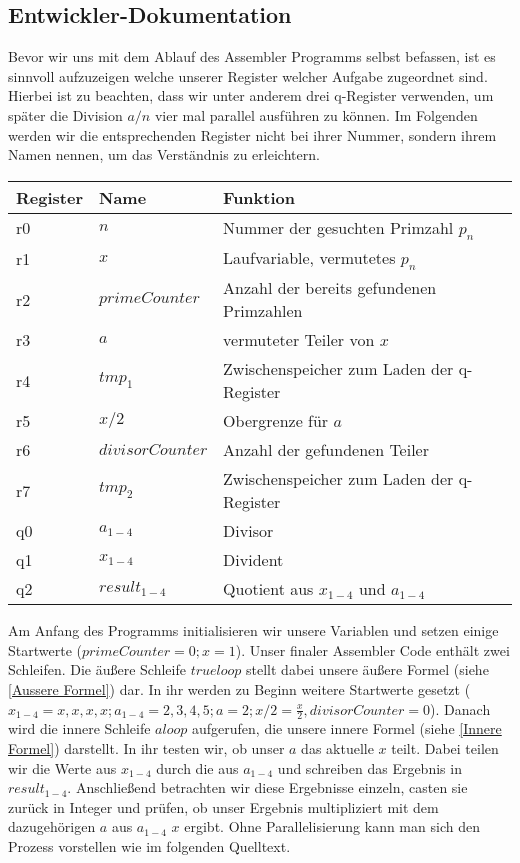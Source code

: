\documentclass[11pt]{scrartcl}
\begin{document}
\subsection{Entwickler-Dokumentation}
Bevor wir uns mit dem Ablauf des Assembler Programms selbst befassen, ist es sinnvoll aufzuzeigen welche unserer Register welcher Aufgabe zugeordnet sind. Hierbei ist zu beachten, dass wir unter anderem drei q-Register verwenden, um später die Division $a/n$ vier mal parallel ausführen zu können. Im Folgenden werden wir die entsprechenden Register nicht bei ihrer Nummer, sondern ihrem Namen nennen, um das Verständnis zu erleichtern. 
\begin{center}
    \begin{tabular}{ | l | l | l | p{15cm} |}
    \hline
    Register &  Name & Funktion \\ \hline
    r0 & $n$ & Nummer der gesuchten Primzahl $p_n$\\ 
    r1 & $x$ & Laufvariable, vermutetes $p_n$\\
    r2 & $primeCounter$ & Anzahl der bereits gefundenen Primzahlen\\
    r3 & $a$ & vermuteter Teiler von $x$\\
    r4 & $tmp_1$ & Zwischenspeicher zum Laden der q-Register\\
    r5 & $x/2$ & Obergrenze für $a$\\
    r6 & $divisorCounter$ & Anzahl der gefundenen Teiler\\ 
    r7 & $tmp_2$ & Zwischenspeicher zum Laden der q-Register\\ 
    q0 & $a_{1-4}$ & Divisor \\ 
    q1 & $x_{1-4}$ & Divident\\ 
    q2 & $result_{1-4}$ & Quotient aus $x_{1-4}$ und $a_{1-4}$\\ \hline
    \end{tabular}
    \label{Register}
\end{center}

Am Anfang des Programms initialisieren wir unsere Variablen und setzen einige Startwerte ($primeCounter=0; x=1$).
Unser finaler Assembler Code enthält zwei Schleifen. Die äußere Schleife $trueloop$ stellt dabei unsere äußere Formel (siehe \ref{Aussere Formel}) dar. In ihr werden zu Beginn weitere Startwerte gesetzt ($x_{1-4} = x,x,x,x; a_{1-4} = 2,3,4,5; a=2; x/2 = \frac{x}{2}, divisorCounter = 0$). Danach wird die innere Schleife $aloop$ aufgerufen, die unsere innere Formel (siehe \ref{Innere Formel}) darstellt. In ihr testen wir, ob unser $a$ das aktuelle $x$ teilt. Dabei teilen wir die Werte aus $x_{1-4}$ durch die aus $a_{1-4}$ und schreiben das Ergebnis in $result_{1-4}$. Anschließend betrachten wir diese Ergebnisse einzeln, casten sie zurück in Integer und prüfen, ob unser Ergebnis multipliziert mit dem dazugehörigen $a$ aus $a_{1-4}$ $x$ ergibt. Ohne Parallelisierung kann man sich den Prozess vorstellen wie im folgenden Quelltext.
\end{document}
